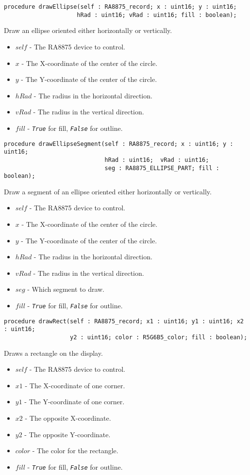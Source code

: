 \documentclass[10pt, openany]{book}
\newcommand{\constant}[1]{\emph{\texttt{#1}}}
\begin{document}
\begin{lstlisting}
procedure drawEllipse(self : RA8875_record; x : uint16; y : uint16;
                     hRad : uint16; vRad : uint16; fill : boolean);
\end{lstlisting}
Draw an ellipse oriented either horizontally or vertically.
\begin{itemize}
  \item $self$ - The RA8875 device to control.
  \item $x$ - The X-coordinate of the center of the circle.
  \item $y$ - The Y-coordinate of the center of the circle.
  \item $hRad$ - The radius in the horizontal direction.
  \item $vRad$ - The radius in the vertical direction.
  \item $fill$ - \constant{True} for fill, \constant{False} for outline.
\end{itemize}

\begin{lstlisting}
procedure drawEllipseSegment(self : RA8875_record; x : uint16; y : uint16;
                             hRad : uint16;  vRad : uint16;
                             seg : RA8875_ELLIPSE_PART; fill : boolean);
\end{lstlisting}
Draw a segment of an ellipse oriented either horizontally or vertically.
\begin{itemize}
  \item $self$ - The RA8875 device to control.
  \item $x$ - The X-coordinate of the center of the circle.
  \item $y$ - The Y-coordinate of the center of the circle.
  \item $hRad$ - The radius in the horizontal direction.
  \item $vRad$ - The radius in the vertical direction.
  \item $seg$ - Which segment to draw.
  \item $fill$ - \constant{True} for fill, \constant{False} for outline.
\end{itemize}

\begin{lstlisting}
procedure drawRect(self : RA8875_record; x1 : uint16; y1 : uint16; x2 : uint16;
                   y2 : uint16; color : R5G6B5_color; fill : boolean);
\end{lstlisting}
Draws a rectangle on the display.
\begin{itemize}
  \item $self$ - The RA8875 device to control.
  \item $x1$ - The X-coordinate of one corner.
  \item $y1$ - The Y-coordinate of one corner.
  \item $x2$ - The opposite X-coordinate.
  \item $y2$ - The opposite Y-coordinate.
  \item $color$ - The color for the rectangle.
  \item $fill$ - \constant{True} for fill, \constant{False} for outline.
\end{itemize}
\end{document}
